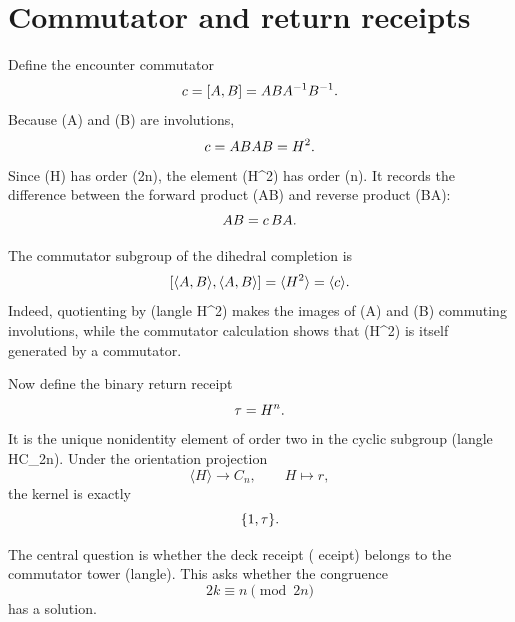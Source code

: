 \section{Commutator and return receipts}

Define the encounter commutator
\[
c=[A,B]=ABA^{-1}B^{-1}.
\]
Because (A) and (B) are involutions,
\[
c=ABAB=H^2.
\]
Since (H) has order (2n), the element (H^2) has order (n). It records
the difference between the forward product (AB) and reverse product (BA):
\[
AB=c\,BA.
\]

The commutator subgroup of the dihedral completion is
\[
[\langle A,B\rangle,\langle A,B\rangle]
=\langle H^2\rangle
=\langle c\rangle.
\]
Indeed, quotienting by (langle H^2\rangle) makes the images of (A) and
(B) commuting involutions, while the commutator calculation shows that
(H^2) is itself generated by a commutator.

Now define the binary return receipt
\[
\tau=H^n.
\]
It is the unique nonidentity element of order two in the cyclic subgroup
(langle H\rangle\cong C_{2n}). Under the orientation projection
\[
\langle H\rangle\longrightarrow C_n,
\qquad H\longmapsto r,
\]
the kernel is exactly
\[
\{1,\tau\}.
\]

The central question is whether the deck receipt (
eceipt) belongs to the
commutator tower (langle\comm\rangle). This asks whether the congruence
\[
2k\equiv n\pmod{2n}
\]
has a solution.

